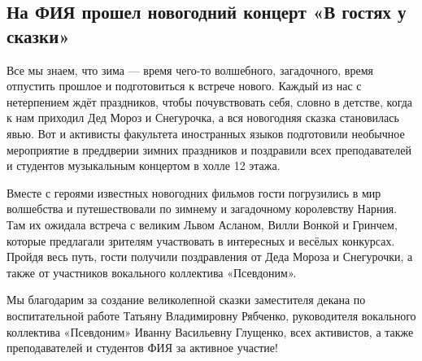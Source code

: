  
 
 
 
 
\subsection{На ФИЯ прошел новогодний концерт «В гостях у сказки»}
\label{sec:27_12_2021.stz.edu.dnr.donnu.1.skazka_koncert_fija}


Все мы знаем, что зима — время чего-то волшебного, загадочного, время отпустить
прошлое и подготовиться к встрече нового. Каждый из нас с нетерпением ждёт
праздников, чтобы почувствовать себя, словно в детстве, когда к нам приходил
Дед Мороз и Снегурочка, а вся новогодняя сказка становилась явью. Вот и
активисты факультета иностранных языков подготовили необычное мероприятие в
преддверии зимних праздников и поздравили всех преподавателей и студентов
музыкальным концертом в холле 12 этажа.


Вместе с героями известных новогодних фильмов гости погрузились в мир
волшебства и путешествовали по зимнему и загадочному королевству Нарния. Там их
ожидала встреча с великим Львом Асланом, Вилли Вонкой и Гринчем, которые
предлагали зрителям участвовать в интересных и весёлых конкурсах. Пройдя весь
путь, гости получили поздравления от Деда Мороза и Снегурочки, а также от
участников вокального коллектива «Псевдоним».


Мы благодарим за создание великолепной сказки заместителя декана по
воспитательной работе Татьяну Владимировну Рябченко, руководителя вокального
коллектива «Псевдоним» Иванну Васильевну Глущенко, всех активистов, а также
преподавателей и студентов ФИЯ за активное участие!
